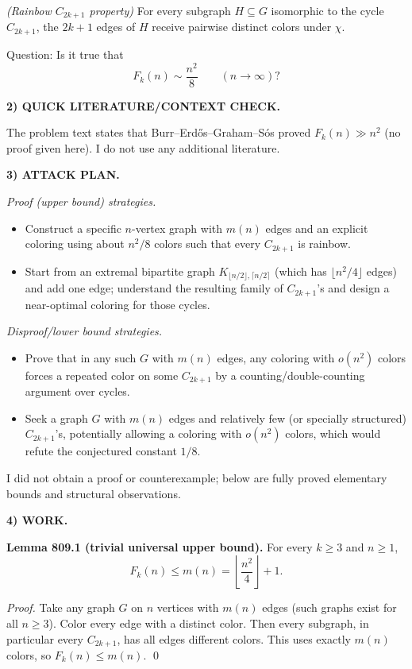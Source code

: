 \emph{(Rainbow $C_{2k+1}$ property)} For every subgraph $H\subseteq G$ isomorphic to the cycle $C_{2k+1}$, the $2k+1$ edges of $H$ receive pairwise distinct colors under $\chi$.

Question: Is it true that
\[
F_k(n)\sim \frac{n^2}{8}\qquad (n\to\infty)?
\]

\medskip
\noindent\textbf{2) QUICK LITERATURE/CONTEXT CHECK.}

The problem text states that Burr--Erd\H{o}s--Graham--S\'os proved $F_k(n)\gg n^2$ (no proof given here). I do not use any additional literature.

\medskip
\noindent\textbf{3) ATTACK PLAN.}

\emph{Proof (upper bound) strategies.}
\begin{itemize}
\item Construct a specific $n$-vertex graph with $m(n)$ edges and an explicit coloring using about $n^2/8$ colors such that every $C_{2k+1}$ is rainbow.
\item Start from an extremal bipartite graph $K_{\lfloor n/2\rfloor,\lceil n/2\rceil}$ (which has $\lfloor n^2/4\rfloor$ edges) and add one edge; understand the resulting family of $C_{2k+1}$'s and design a near-optimal coloring for those cycles.
\end{itemize}

\emph{Disproof/lower bound strategies.}
\begin{itemize}
\item Prove that in any such $G$ with $m(n)$ edges, any coloring with $o(n^2)$ colors forces a repeated color on some $C_{2k+1}$ by a counting/double-counting argument over cycles.
\item Seek a graph $G$ with $m(n)$ edges and relatively few (or specially structured) $C_{2k+1}$'s, potentially allowing a coloring with $o(n^2)$ colors, which would refute the conjectured constant $1/8$.
\end{itemize}

I did not obtain a proof or counterexample; below are fully proved elementary bounds and structural observations.

\medskip
\noindent\textbf{4) WORK.}

\textbf{Lemma 809.1 (trivial universal upper bound).}
For every $k\ge 3$ and $n\ge 1$,
\[
F_k(n)\le m(n)=\left\lfloor \frac{n^2}{4}\right\rfloor+1.
\]

\emph{Proof.}
Take any graph $G$ on $n$ vertices with $m(n)$ edges (such graphs exist for all $n\ge 3$). Color every edge with a distinct color. Then every subgraph, in particular every $C_{2k+1}$, has all edges different colors. This uses exactly $m(n)$ colors, so $F_k(n)\le m(n)$.
\qed

